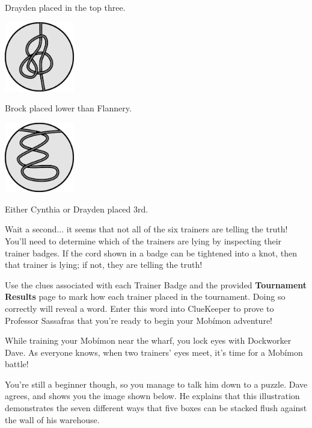 \documentclass{puzzlehunt}
\begin{document}
\begin{multicols}{3}
\begin{center}
    Drayden placed in the top three.


    \includegraphics[width=1.2in]{assets/knot3.pdf}

    Brock placed lower than Flannery.


    \includegraphics[width=1.2in]{assets/unknot3.pdf}

    Either Cynthia or Drayden placed 3rd.
  \end{center}
\end{multicols}

\newpage


Wait a second... it seems that not all of the six trainers are telling the truth! You'll need to determine which of the trainers are lying by inspecting their trainer badges. If the cord shown in a badge can be tightened into a knot, then that trainer is lying; if not, they are telling the truth!

Use the clues associated with each Trainer Badge and the provided \textbf{Tournament Results} 
page to mark how each trainer placed in the tournament. Doing so correctly will reveal a word. 
Enter this word into ClueKeeper to prove to Professor Sassafras that you're ready to begin your 
Mob\'imon adventure!

\vfill


While training your Mob\'imon near the wharf, you lock eyes with Dockworker Dave. As everyone knows, when two trainers' eyes meet, it's time for a Mob\'imon battle!

You're still a beginner though, so you manage to talk him down to a puzzle. Dave agrees, and shows you the image shown below. He explains that this illustration demonstrates the seven different ways that five boxes can be stacked flush against the wall of his warehouse.
\end{document}
